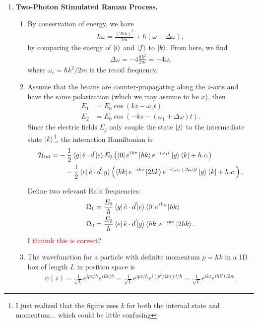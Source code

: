 \documentclass{article}
\theoremstyle{definition}
\newcommand{\f}[2]{\frac{#1}{#2}}
\newcommand{\lp}{\left(}
\newcommand{\rp}{\right)}
\begin{document}
\begin{enumerate}
	\item \textbf{Two-Photon Stimulated Raman Process.} 
	\begin{enumerate}[label=(\alph*)]
		\item By conservation of energy, we have
		\begin{align*}
		\hbar \omega = \f{(2\hbar k)^2}{2m} + \hbar (\omega + \Delta \omega),
		\end{align*}
		by comparing the energy of $\ket{i}$ and $\ket{f}$ to $\ket{k}$. From here, we find 
		\begin{align*}
		\Delta \omega = -4 \f{\hbar k^2}{2m}=  - 4\omega_r
		\end{align*}
		where $\omega_r = \hbar k^2/2m$ is the recoil frequency. 
		
		\item Assume that the beams are counter-propagating along the $z$-axis and have the same polarization (which we may assume to be $x$), then
		\begin{align*}
		E_1 &= E_0 \cos(kz - \omega_1 t) \\
		E_2 &= E_0 \cos(-kz - (\omega_1 + \Delta \omega) t). 
		\end{align*}
		Since the electric fields $E_j$ only couple the state $\ket{j}$ to the intermediate state $\ket{k}$\footnote{I just realized that the figure uses $k$ for both the internal state and momentum... which could be little confusing}, the interaction Hamiltonian is 
		\begin{align*}
		\mathcal{H}_\text{int} = &-\f{1}{2}\bra{g} \hat{e}\cdot \vec{d}\ket{e}E_0\lp \bra{0}e^{ikz}\ket{\hbar k} e^{-i\omega_1 t} \ket{g}\bra{k} + h.c. \rp\\ 
		& \quad -\f{1}{2}\bra{e}\hat{e}\cdot \vec{d}\ket{g}\lp \bra{\hbar k } e^{-ikz} \ket{2\hbar k}e^{-i(\omega_1 + \Delta \omega) t} \ket{g}\bra{k} + h.c. \rp. 
		\end{align*}
		
		Define two relevant Rabi frequencies:
		\begin{align*}
		&\Omega_{1} = \f{E_0}{\hbar}\bra{g} \hat{e}\cdot \vec{d}\ket{e} \bra{0}e^{ikz}\ket{\hbar k} \\
		&\Omega_2 = \f{E_0}{\hbar}\bra{e} \hat{e}\cdot \vec{d}\ket{g} \bra{\hbar k}e^{-ikz}\ket{2\hbar k}.
		\end{align*}
		\textcolor{red}{I thiiiink this is correct?}
		
		\item The wavefunction for a particle with definite momentum $p  = \hbar k$ in a 1D box of length $L$ in position space is 
		\begin{align*}
		\psi(z) = \f{1}{\sqrt{L}}e^{i pz/\hbar} e^{iEt/\hbar} = \f{1}{\sqrt{L}}e^{i pz/\hbar} e^{i(p^2/2m)t/\hbar} = \f{1}{\sqrt{L}}e^{ikz} e^{i\hbar k^2 t/2m}.
		\end{align*}
		

\end{enumerate}
\end{enumerate}
\end{document}
